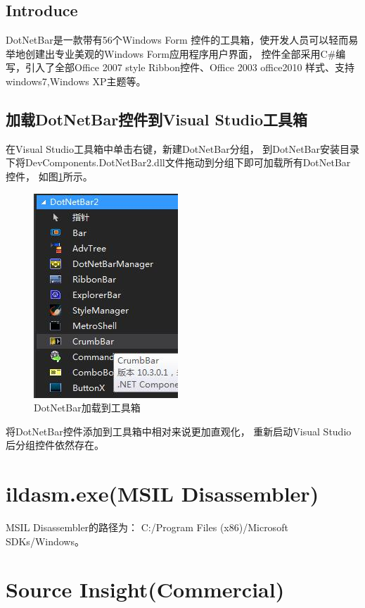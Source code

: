 \documentclass{book}
\begin{document}
\subsection{Introduce}

DotNetBar是一款带有56个Windows Form 控件的工具箱，使开发人员可以轻而易举地创建出专业美观的Windows Form应用程序用户界面，
控件全部采用C\#编写，引入了全部Office 2007 style Ribbon控件、Office 2003 office2010 样式、支持windows7,Windows XP主题等。

\subsection{加载DotNetBar控件到Visual Studio工具箱}

在Visual Studio工具箱中单击右键，新建DotNetBar分组，
到DotNetBar安装目录下将DevComponents.DotNetBar2.dll文件拖动到分组下即可加载所有DotNetBar控件，
如图\ref{fig:DotNetBarControlLoadIntoToolBox}所示。

\begin{figure}[htbp]
	\centering
	\includegraphics[scale=0.8]{DotNetBarControlLoadIntoToolBox.jpg}
	\caption{DotNetBar加载到工具箱}
	\label{fig:DotNetBarControlLoadIntoToolBox}
\end{figure}

将DotNetBar控件添加到工具箱中相对来说更加直观化，
重新启动Visual Studio后分组控件依然存在。

\section{ildasm.exe(MSIL Disassembler)}

MSIL Disassembler的路径为：
C:/Program Files (x86)/Microsoft SDKs/Windows。

\section{Source Insight(Commercial)}
\end{document}
